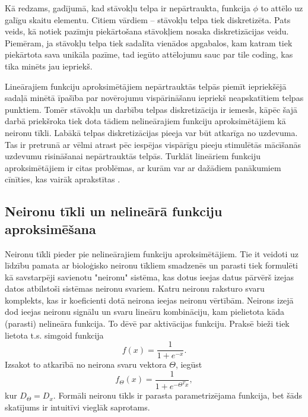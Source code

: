 \documentclass{ludis} %
\begin{document}
Kā redzams, gadījumā, kad stāvokļu telpa ir nepārtraukta, funkcija $\phi$ to attēlo uz galīgu skaitu elementu.
Citiem vārdiem -- stāvokļu telpa tiek diskretizēta.
Pats veids, kā notiek pazīmju piekārtošana stāvokļiem nosaka diskretizācijas veidu.
Piemēram, ja stāvokļu telpa tiek sadalīta vienādos apgabalos, kam katram tiek piekārtota sava unikāla pazīme, tad iegūto attēlojumu sauc par tile coding, kas tika minēts jau iepriekš.

Lineārajiem funkciju aproksimētājiem nepārtrauktās telpās piemīt iepriekšējā sadaļā minētā īpašība par novērojumu vispārināšanu iepriekš neapskatītiem telpas punktiem.
Tomēr stāvokļu un darbību telpas diskretizācija ir iemesls, kāpēc šajā darbā priekšroka tiek dota tādiem nelineārajiem funkciju aproksimētājiem kā neironu tīkli.
Labākā telpas diskretizācijas pieeja var būt atkarīga no uzdevuma.
Tas ir pretrunā ar vēlmi atrast pēc iespējas vispārīgu pieeju stimulētās mācīšanās uzdevumu risināšanai nepārtrauktās telpās.
Turklāt lineāriem funkciju aproksimētājiem ir citas problēmas, ar kurām var ar dažādiem panākumiem cīnīties, kas vairāk aprakstītas \autocite{Hasselt2012} .

\subsection{Neironu tīkli un nelineārā funkciju aproksimēšana}
Neironu tīkli pieder pie nelineārajiem funkciju aproksimētājiem.
Tie it veidoti uz līdzību pamata ar bioloģisko neironu tīkliem smadzenēs un parasti tiek formulēti kā savstarpēji savienotu "neironu" sistēma, kas dotus ieejas datus pārvērš izejas datos atbilstoši sistēmas neironu svariem.
Katru neironu raksturo svaru komplekts, kas ir koeficienti dotā neirona ieejas neironu vērtībām.
Neirons izejā dod ieejas neironu signālu un svaru lineāru kombināciju, kam pielietota kāda (parasti) nelineāra funkcija. To dēvē par aktivācijas funkciju.
Praksē bieži tiek lietota t.s. simgoid funkcija
\[
	f(x) = \frac{1}{1 + e^{-x}}.
\]
Izsakot to atkarībā no neirona svaru vektora $\Theta$, iegūst
\[
	f_\Theta(x) = \frac{1}{1 + e^{-\Theta^T x}},
\]
kur $D_\Theta = D_x$. Formāli neironu tīkls ir parasta parametrizējama funkcija, bet šāds skatījums ir intuitīvi vieglāk saprotams.
\end{document}
